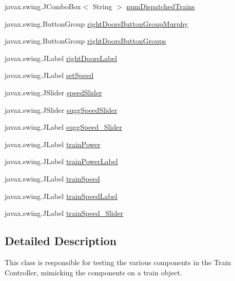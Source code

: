 \begin{DoxyCompactItemize}
javax.\+swing.\+J\+Combo\+Box$<$ String $>$ \hyperlink{classTrainControllerComps_1_1TCTestConsole_af08c073d08ed471e509709158a0ca2d3}{num\+Dispatched\+Trains}
\item 
javax.\+swing.\+Button\+Group \hyperlink{classTrainControllerComps_1_1TCTestConsole_a857ac857bbf765132239734e62c78210}{right\+Doors\+Button\+Group\+Murphy}
\item 
javax.\+swing.\+Button\+Group \hyperlink{classTrainControllerComps_1_1TCTestConsole_a5fd502aa4588d4ec5d4503cad1dc399c}{right\+Doors\+Button\+Groups}
\item 
javax.\+swing.\+J\+Label \hyperlink{classTrainControllerComps_1_1TCTestConsole_a9305662f0767e36bf1f990834b73cfc3}{right\+Doors\+Label}
\item 
javax.\+swing.\+J\+Label \hyperlink{classTrainControllerComps_1_1TCTestConsole_ad8105908c48ad8b5fd4c0a951db655a2}{set\+Speed}
\item 
javax.\+swing.\+J\+Slider \hyperlink{classTrainControllerComps_1_1TCTestConsole_a493fcafc1264f633059e840f83207593}{speed\+Slider}
\item 
javax.\+swing.\+J\+Slider \hyperlink{classTrainControllerComps_1_1TCTestConsole_a9d7e5b560ae353604fe3281c949dc2a7}{sugg\+Speed\+Slider}
\item 
javax.\+swing.\+J\+Label \hyperlink{classTrainControllerComps_1_1TCTestConsole_af9f54adad63841cba14c0bbb41ab3de7}{sugg\+Speed\+\_\+\+Slider}
\item 
javax.\+swing.\+J\+Label \hyperlink{classTrainControllerComps_1_1TCTestConsole_a1e94ccf980f441f8e7c411ed38c42be5}{train\+Power}
\item 
javax.\+swing.\+J\+Label \hyperlink{classTrainControllerComps_1_1TCTestConsole_ac2dc24779140f31fd6f33be4be926c96}{train\+Power\+Label}
\item 
javax.\+swing.\+J\+Label \hyperlink{classTrainControllerComps_1_1TCTestConsole_a5ffb3ab5c0f9a7fc37f72c77e70432a9}{train\+Speed}
\item 
javax.\+swing.\+J\+Label \hyperlink{classTrainControllerComps_1_1TCTestConsole_a6d89bc3a12936a14165ba016d51df6b6}{train\+Speed\+Label}
\item 
javax.\+swing.\+J\+Label \hyperlink{classTrainControllerComps_1_1TCTestConsole_a4fbf210d4a143467d39d3311171422dd}{train\+Speed\+\_\+\+Slider}
\end{DoxyCompactItemize}


\subsection{Detailed Description}
This class is responsible for testing the various components in the Train Controller, mimicking the components on a train object. 


